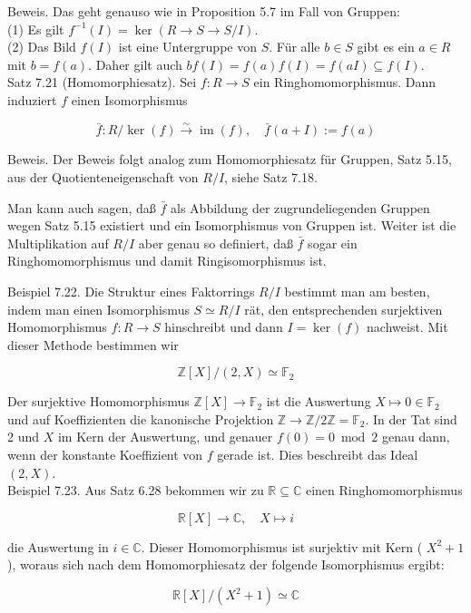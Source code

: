 \documentclass[10pt, letterpaper]{article}
\begin{document}
Beweis. Das geht genauso wie in Proposition 5.7 im Fall von Gruppen:\\
(1) Es gilt $f^{-1}(I)=\operatorname{ker}(R \rightarrow S \rightarrow S / I)$.\\
(2) Das Bild $f(I)$ ist eine Untergruppe von $S$. Für alle $b \in S$ gibt es ein $a \in R$ mit $b=f(a)$. Daher gilt auch $b f(I)=f(a) f(I)=f(a I) \subseteq f(I)$.\\
Satz 7.21 (Homomorphiesatz). Sei $f: R \rightarrow S$ ein Ringhomomorphismus. Dann induziert $f$ einen Isomorphismus

$$
\bar{f}: R / \operatorname{ker}(f) \xrightarrow{\sim} \operatorname{im}(f), \quad \bar{f}(a+I):=f(a)
$$

Beweis. Der Beweis folgt analog zum Homomorphiesatz für Gruppen, Satz 5.15, aus der Quotienteneigenschaft von $R / I$, siehe Satz 7.18.

Man kann auch sagen, daß $\bar{f}$ als Abbildung der zugrundeliegenden Gruppen wegen Satz 5.15 existiert und ein Isomorphismus von Gruppen ist. Weiter ist die Multiplikation auf $R / I$ aber genau so definiert, daß $\bar{f}$ sogar ein Ringhomomorphismus und damit Ringisomorphismus ist.

Beispiel 7.22. Die Struktur eines Faktorrings $R / I$ bestimmt man am besten, indem man einen Isomorphismus $S \simeq R / I$ rät, den entsprechenden surjektiven Homomorphismus $f: R \rightarrow S$ hinschreibt und dann $I=\operatorname{ker}(f)$ nachweist. Mit dieser Methode bestimmen wir

$$
\mathbb{Z}[X] /(2, X) \simeq \mathbb{F}_{2}
$$

Der surjektive Homomorphismus $\mathbb{Z}[X] \rightarrow \mathbb{F}_{2}$ ist die Auswertung $X \mapsto 0 \in \mathbb{F}_{2}$ und auf Koeffizienten die kanonische Projektion $\mathbb{Z} \rightarrow \mathbb{Z} / 2 \mathbb{Z}=\mathbb{F}_{2}$. In der Tat sind 2 und $X$ im Kern der Auswertung, und genauer $f(0)=0 \bmod 2$ genau dann, wenn der konstante Koeffizient von $f$ gerade ist. Dies beschreibt das Ideal $(2, X)$.\\
Beispiel 7.23. Aus Satz 6.28 bekommen wir zu $\mathbb{R} \subseteq \mathbb{C}$ einen Ringhomomorphismus

$$
\mathbb{R}[X] \rightarrow \mathbb{C}, \quad X \mapsto i
$$

die Auswertung in $i \in \mathbb{C}$. Dieser Homomorphismus ist surjektiv mit Kern ( $X^{2}+1$ ), woraus sich nach dem Homomorphiesatz der folgende Isomorphismus ergibt:

$$
\mathbb{R}[X] /\left(X^{2}+1\right) \simeq \mathbb{C}
$$
\end{document}
